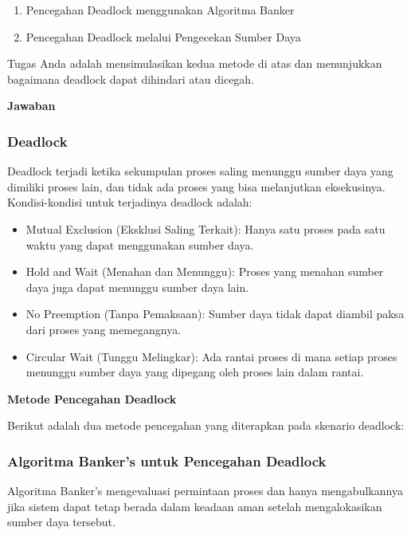 \documentclass[12pt]{article}
\begin{document}
\begin{enumerate}
    \item Pencegahan Deadlock menggunakan Algoritma Banker
    \item Pencegahan Deadlock melalui Pengecekan Sumber Daya
\end{enumerate}
Tugas Anda adalah mensimulasikan kedua metode di atas dan menunjukkan bagaimana deadlock dapat dihindari atau dicegah.


\textbf{Jawaban}
\subsubsection{Deadlock}
Deadlock terjadi ketika sekumpulan proses saling menunggu sumber daya yang dimiliki proses lain, dan tidak ada proses yang bisa melanjutkan eksekusinya. Kondisi-kondisi untuk terjadinya deadlock adalah:
\begin{itemize}
    \item Mutual Exclusion (Eksklusi Saling Terkait): Hanya satu proses pada satu waktu yang dapat menggunakan sumber daya.
    \item Hold and Wait (Menahan dan Menunggu): Proses yang menahan sumber daya juga dapat menunggu sumber daya lain.
    \item No Preemption (Tanpa Pemaksaan): Sumber daya tidak dapat diambil paksa dari proses yang memegangnya.
    \item Circular Wait (Tunggu Melingkar): Ada rantai proses di mana setiap proses menunggu sumber daya yang dipegang oleh proses lain dalam rantai.
\end{itemize}

\textbf{Metode Pencegahan Deadlock}

Berikut adalah dua metode pencegahan yang diterapkan pada skenario deadlock:

\subsubsection{Algoritma Banker's untuk Pencegahan Deadlock}
Algoritma Banker's mengevaluasi permintaan proses dan hanya mengabulkannya jika sistem dapat tetap berada dalam keadaan aman setelah mengalokasikan sumber daya tersebut.
\end{document}
